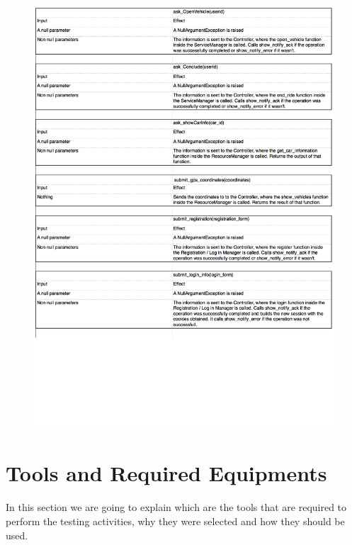 \documentclass[a4paper,10pt]{article}
\begin{document}
    \begin{figure}[!h]
  \centering
    \includegraphics[scale=0.26]{Resources/9.png}
  \end{figure}
  \FloatBarrier
\section{Tools and Required Equipments}

In this section we are going to explain which are the tools that are required to perform the testing activities, why they were selected and how they should be used.
\end{document}
